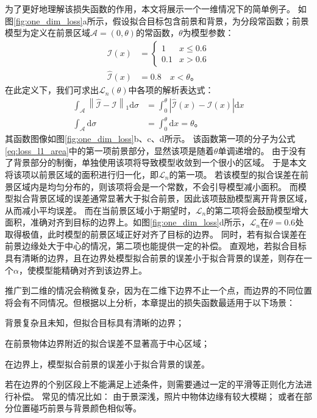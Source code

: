 为了更好地理解该损失函数的作用，本文将展示一个一维情况下的简单例子。
如图\ref{fig:one_dim_loss}a所示，假设拟合目标包含前景和背景，为分段常函数；前景模型为定义在前景区域$\mathcal{A}=(0,\theta)$的常函数，$\theta$为模型参数：
\begin{align}
\mathcal{I}(x) &= \begin{cases}
    1   & x \leq 0.6 \\
    0.1 & x > 0.6
\end{cases}\\
\hat{\mathcal{I}}(x) &= 0.8 \quad x < \theta
\text{。}
\end{align}
在此定义下，我们可求出$\mathcal{L}_n(\theta)$中各项的解析表达式：
\begin{align}
\int_{\mathcal{A}} \left\| \hat{\mathcal{I}} - \mathcal{I} \right\|_1 \mathrm{d}\sigma
&= \int_0^{\theta} \left| \hat{\mathcal{I}}(x) - \mathcal{I}(x) \right| \mathrm{d}x \\
\int_{\mathcal{A}}\mathrm{d}\sigma &= \int_0^{\theta} \mathrm{d}x = \theta
\text{。}
\end{align}
其函数图像如图\ref{fig:one_dim_loss}b、c、d所示。
该函数第一项的分子为公式\ref{eq:loss_l1_area}中的第一项前景部分，显然该项是随着$\theta$单调递增的。
由于没有了背景部分的制衡，单独使用该项将导致模型收敛到一个很小的区域。
于是本文将该项以前景区域的面积进行归一化，即$\mathcal{L}_n$的第一项。
若该模型的拟合误差在前景区域内是均匀分布的，则该项将会是一个常数，不会引导模型减小面积。
而模型拟合背景区域的误差通常显著大于拟合前景，因此该项鼓励模型离开背景区域，从而减小平均误差。
而在当前景区域小于期望时，$\mathcal{L}_n$的第二项将会鼓励模型增大面积，准确对齐到目标的边界上。如图\ref{fig:one_dim_loss}d所示，$\mathcal{L}_n$在$\theta=0.6$处取得极值，此时模型的前景区域正好对齐了目标的边界。
同时，若有拟合误差在前景边缘处大于中心的情况，第二项也能提供一定的补偿。
直观地，若拟合目标具有清晰的边界，且在边界处模型拟合前景的误差小于拟合背景的误差，则存在一个$\alpha$，使模型能精确对齐到该边界上。

推广到二维的情况会稍微复杂，因为在二维下边界不止一个点，而边界的不同位置将会有不同情况。但根据以上分析，本章提出的损失函数最适用于以下场景：
\begin{enumerate*}
    \item 背景复杂且未知，但拟合目标具有清晰的边界；
    \item 在前景物体边界附近的拟合误差不显著高于中心区域；
    \item 在边界上，模型拟合前景的误差小于拟合背景的误差。
\end{enumerate*}
若在边界的个别区段上不能满足上述条件，则需要通过一定的平滑等正则化方法进行补偿。
常见的情况比如：
由于景深浅，照片中物体边缘有较大模糊；
或者在部分位置碰巧前景与背景颜色相似等。

